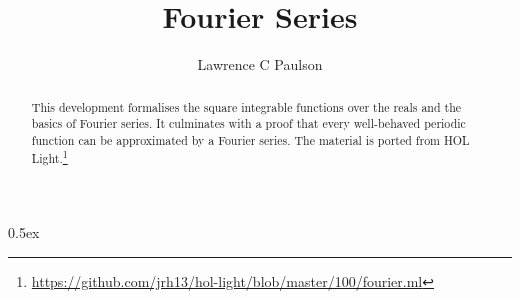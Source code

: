 \documentclass[11pt,a4paper]{article}
\begin{document}
\title{Fourier Series}
\author{Lawrence C Paulson}
\date{}
\maketitle

\begin{abstract}
This development formalises the square integrable functions over the reals and the basics of Fourier series. It culminates with a proof that every well-behaved periodic function can be approximated by a Fourier series. The material is ported from HOL Light.\footnote{\url{https://github.com/jrh13/hol-light/blob/master/100/fourier.ml}}
\end{abstract}

\tableofcontents

\parindent 0pt\parskip 0.5ex



%
%
\end{document}
